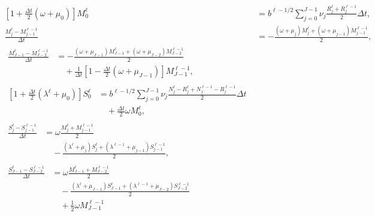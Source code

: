 \documentclass[USenglish]{article}
\begin{document}
\begin{subequations}
  \label{numerics_age_structured}
  \begin{align}
    \left[1 + \frac{\Delta t}{2} (\omega + \mu_0)\right]
    M_0^{\ell}
    &= b^{\ell - 1 / 2}
    \sum_{j = 0}^{J - 1} \nu_j \frac{R_j^{\ell} + R_j^{\ell - 1}}{2}
    \Delta t,
    \\
    \frac{M_j^{\ell} - M_{j - 1}^{\ell - 1}}{\Delta t} &=
    - \frac{(\omega + \mu_j) M_j^{\ell}
      + (\omega + \mu_{j - 1}) M_{j - 1}^{\ell - 1}}{2},
    \\
    \begin{split}
      \frac{M_{J - 1}^{\ell} - M_{J - 2}^{\ell - 1}}{\Delta t} &=
      - \frac{(\omega + \mu_{J - 1}) M_{J - 1}^{\ell}
        + (\omega + \mu_{J - 2}) M_{J - 2}^{\ell - 1}}{2}
      \\ & \quad {}
      + \frac{1}{\Delta t} \left[
        1 - \frac{\Delta t}{2} (\omega + \mu_{J - 1})
      \right] M_{J - 1}^{\ell - 1},
    \end{split}
    \\
    \begin{split}
      \left[1 + \frac{\Delta t}{2} (\lambda^{\ell} + \mu_0)\right] S_0^{\ell}
      &= b^{\ell - 1 / 2}
      \sum_{j = 0}^{J - 1}
      \nu_j
      \frac{N_j^{\ell} - R_j^{\ell} + N_j^{\ell - 1} - R_j^{\ell - 1}}{2}
      \Delta t
      \\ & \quad {}
      + \frac{\Delta t}{2} \omega M_0^{\ell},
    \end{split}
    \\
    \begin{split}
      \frac{S_j^{\ell} - S_{j - 1}^{\ell - 1}}{\Delta t} &=
      \omega \frac{M_j^{\ell} + M_{j - 1}^{\ell - 1}}{2}
      \\ & \quad {}
      - \frac{(\lambda^{\ell} + \mu_j) S_j^{\ell}
        + (\lambda^{\ell - 1} + \mu_{j - 1}) S_{j - 1}^{\ell - 1}}{2},
    \end{split}
    \\
    \begin{split}
      \frac{S_{J - 1}^{\ell} - S_{J - 2}^{\ell - 1}}{\Delta t} &=
      \omega \frac{M_{J - 1}^{\ell} + M_{J - 2}^{\ell - 1}}{2}
      \\ & \quad {}
      - \frac{(\lambda^{\ell} + \mu_{J - 1}) S_{J - 1}^{\ell}
        + (\lambda^{\ell - 1} + \mu_{J - 2}) S_{J - 2}^{\ell - 1}}
      {2}
      \\ & \quad {}
      + \frac{1}{2} \omega M_{J - 1}^{\ell - 1}
      \\ & \quad {}

\end{split}
\end{align}
\end{subequations}
\end{document}
